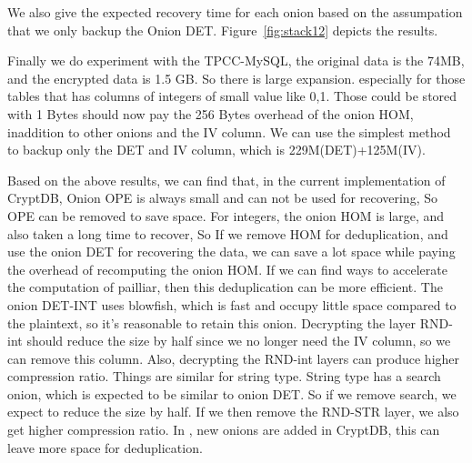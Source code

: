 








We also give the expected recovery time for each onion based on the assumpation that we only backup the Onion DET. Figure~\ref{fig:stack12} depicts the results.


Finally we do experiment with the TPCC-MySQL, the original data is the 74MB, and the encrypted data is 1.5 GB. So there is large expansion. especially for those tables that has columns of integers of small value like 0,1. Those could be stored with 1 Bytes should now pay the 256 Bytes overhead of the onion HOM, inaddition to other onions and the IV column. We can use the simplest method to backup only the DET and IV column, which is 229M(DET)+125M(IV). 







Based on the above results, we can find that, in the current implementation of CryptDB, Onion OPE is always small and can not be used for recovering, So OPE can be removed  to save space. For integers, the onion HOM is large, and also taken a long time to recover, So If we remove HOM for deduplication, and use the onion DET for recovering the data, we can save a lot space while paying the overhead of recomputing the onion HOM. If we can find ways to accelerate the computation of pailliar, then this deduplication can be more efficient. The onion DET-INT uses blowfish, which is fast and occupy little space compared to the plaintext, so it's reasonable to retain this onion. Decrypting the layer RND-int should reduce the size by half since we no longer need the IV column, so we can remove this column. Also, decrypting the RND-int layers can produce higher compression ratio. Things are similar for string type. String type has a search onion, which is expected to be similar to onion DET. So if we remove search, we expect to reduce the size by half. If we then remove the RND-STR layer, we also get higher compression ratio. In \citep{popa2015guidelines}, new onions are added in CryptDB, this can leave more space for deduplication.

